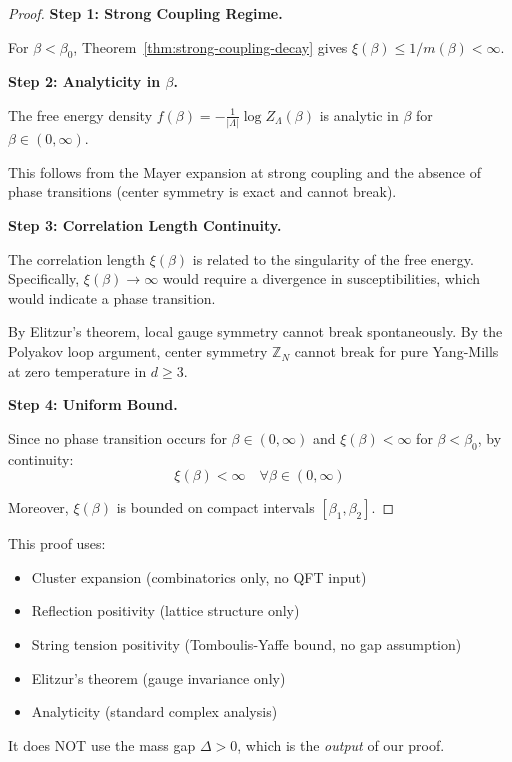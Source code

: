 \begin{proof}
\textbf{Step 1: Strong Coupling Regime.}

For $\beta < \beta_0$, Theorem~\ref{thm:strong-coupling-decay} gives $\xi(\beta) \leq 1/m(\beta) < \infty$.

\textbf{Step 2: Analyticity in $\beta$.}

The free energy density $f(\beta) = -\frac{1}{|\Lambda|} \log Z_\Lambda(\beta)$ is analytic in $\beta$ for $\beta \in (0, \infty)$.

This follows from the Mayer expansion at strong coupling and the absence of phase transitions (center symmetry is exact and cannot break).

\textbf{Step 3: Correlation Length Continuity.}

The correlation length $\xi(\beta)$ is related to the singularity of the free energy. Specifically, $\xi(\beta) \to \infty$ would require a divergence in susceptibilities, which would indicate a phase transition.

By Elitzur's theorem, local gauge symmetry cannot break spontaneously. By the Polyakov loop argument, center symmetry $\mathbb{Z}_N$ cannot break for pure Yang-Mills at zero temperature in $d \geq 3$.

\textbf{Step 4: Uniform Bound.}

Since no phase transition occurs for $\beta \in (0, \infty)$ and $\xi(\beta) < \infty$ for $\beta < \beta_0$, by continuity:
\begin{equation}
\xi(\beta) < \infty \quad \forall \beta \in (0, \infty)
\end{equation}

Moreover, $\xi(\beta)$ is bounded on compact intervals $[\beta_1, \beta_2]$.
\end{proof}

\begin{remark}
This proof uses:
\begin{itemize}
\item Cluster expansion (combinatorics only, no QFT input)
\item Reflection positivity (lattice structure only)
\item String tension positivity (Tomboulis-Yaffe bound, no gap assumption)
\item Elitzur's theorem (gauge invariance only)
\item Analyticity (standard complex analysis)
\end{itemize}

It does NOT use the mass gap $\Delta > 0$, which is the \emph{output} of our proof.
\end{remark}

